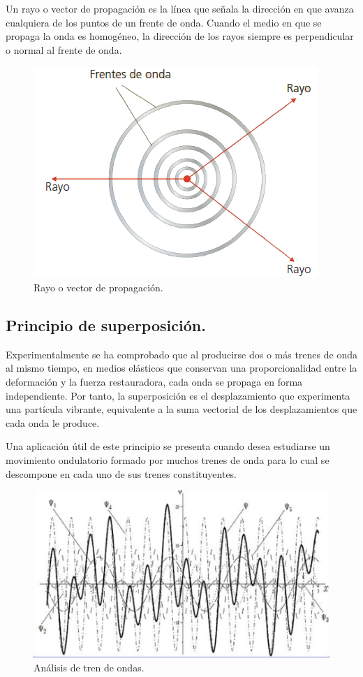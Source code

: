 \documentclass[12pt, letter]{article}
\begin{document}
Un rayo o vector de propagación es la línea que señala la dirección en que avanza cualquiera de los puntos de un frente de onda. Cuando el medio en que se propaga la onda es homogéneo, la dirección de los rayos siempre es perpendicular o normal al frente de onda.
\begin{figure}[H]
    \centering
    \includegraphics[scale=0.8]{Imagenes/Frente_Onda_01.png}
    \caption{Rayo o vector de propagación.}
\end{figure}

\subsection{Principio de superposición.}

Experimentalmente se ha comprobado que al producirse dos o más trenes de onda al mismo tiempo, en medios elásticos que conservan una proporcionalidad entre la deformación y la fuerza restauradora, cada onda se propaga en forma independiente. Por tanto, la superposición es el desplazamiento que experimenta una partícula vibrante, equivalente a la suma vectorial de los desplazamientos que cada onda le produce.

Una aplicación útil de este principio se presenta cuando desea estudiarse un movimiento ondulatorio formado por muchos trenes de onda para lo cual se descompone en cada uno de sus trenes constituyentes.
\begin{figure}[H]
    \centering
    \includegraphics[scale=0.7]{Imagenes/Tren_Onda_02.png}
    \caption{Análisis de tren de ondas.}
\end{figure}
\end{document}
